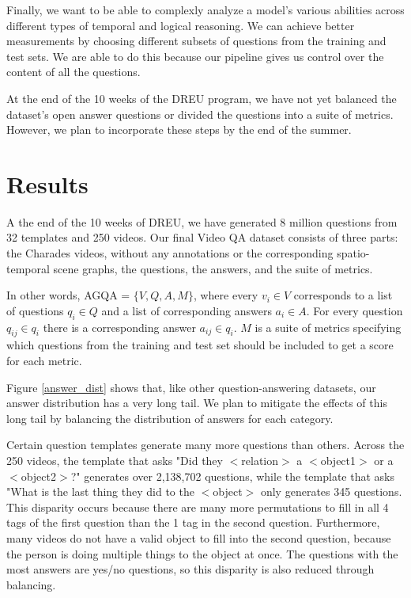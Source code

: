 \documentclass[10pt,twocolumn,letterpaper]{article}
\newcommand{\mgm}[1]{{\color{cyan}{mgm: #1}}}
\begin{document}
    Finally, we want to be able to complexly analyze a model's various abilities across different types of temporal and logical reasoning. We can achieve better measurements by choosing different subsets of questions from the training and test sets. We are able to do this because our pipeline gives us control over the content of all the questions. 
    
    \mgm{Will create a whole section about this. I'll probably put it in the analysis section instead}
    
    At the end of the 10 weeks of the DREU program, we have not yet balanced the dataset's open answer questions or divided the questions into a suite of metrics. However, we plan to incorporate these steps by the end of the summer. 

\section{Results}

A the end of the 10 weeks of DREU, we have generated 8 million questions from 32 templates and 250 videos. Our final Video QA dataset consists of three parts: the Charades videos, without any annotations or the corresponding spatio-temporal scene graphs, the questions, the answers, and the suite of metrics. 

In other words, AGQA = $\{ V, Q, A, M \}$, where every $v_i \in V$ corresponds to a list of questions $q_i  \in Q$ and a list of corresponding answers $a_i \in A$. For every question $q_{ij} \in q_i$ there is a corresponding answer $a_{ij} \in q_i$. $M$ is a suite of metrics specifying which questions from the training and test set should be included to get a score for each metric. \mgm{neither clevr or gqa really rescribe it like this}


Figure \ref{answer_dist} shows that, like other question-answering datasets, our answer distribution has a very long tail. We plan to mitigate the effects of this long tail by balancing the distribution of answers for each category. 

Certain question templates generate many more questions than others. Across the 250 videos, the template that asks "Did they $<$relation$>$ a $<$object1$>$ or a $<$object2$>$?" generates over 2,138,702 questions, while the template that asks "What is the last thing they did to the $<$object$>$ only generates 345 questions. This disparity occurs because there are many more permutations to fill in all 4 tags of the first question than the 1 tag in the second question. Furthermore, many videos do not have a valid object to fill into the second question, because the person is doing multiple things to the object at once. The questions with the most answers are yes/no questions, so this disparity is also reduced through balancing. 
\end{document}
